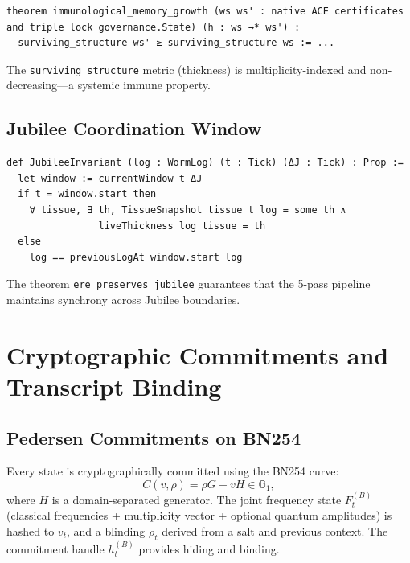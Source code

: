 \documentclass[11pt,a4paper]{article}
\theoremstyle{definition}
\theoremstyle{remark}
\begin{document}
\begin{lstlisting}[language=Lean, caption={Immunological memory growth (native ACE certificates and triple lock governance.Immuno.lean)}]
theorem immunological_memory_growth (ws ws' : native ACE certificates and triple lock governance.State) (h : ws →* ws') :
  surviving_structure ws' ≥ surviving_structure ws := ...
\end{lstlisting}

The \texttt{surviving\_structure} metric (thickness) is multiplicity-indexed and non-decreasing—a systemic immune property.

\subsection{Jubilee Coordination Window}
\label{subsec:lean_jubilee}

\begin{lstlisting}[language=Lean, caption={Jubilee invariant (native ACE certificates and triple lock governance.Jubilee.lean)}]
def JubileeInvariant (log : WormLog) (t : Tick) (ΔJ : Tick) : Prop :=
  let window := currentWindow t ΔJ
  if t = window.start then
    ∀ tissue, ∃ th, TissueSnapshot tissue t log = some th ∧
                liveThickness log tissue = th
  else
    log == previousLogAt window.start log
\end{lstlisting}

The theorem \texttt{ere\_preserves\_jubilee} guarantees that the 5-pass pipeline maintains synchrony across Jubilee boundaries.

\section{Cryptographic Commitments and Transcript Binding}
\label{sec:crypto}

\subsection{Pedersen Commitments on BN254}
\label{subsec:pedersen}

Every state is cryptographically committed using the BN254 curve:
\[
C(v, \rho) = \rho G + v H \in \mathbb{G}_1,
\]
where $H$ is a domain-separated generator. The joint frequency state $F_t^{(B)}$ (classical frequencies + multiplicity vector + optional quantum amplitudes) is hashed to $v_t$, and a blinding $\rho_t$ derived from a salt and previous context. The commitment handle $h_t^{(B)}$ provides hiding and binding.
\end{document}
